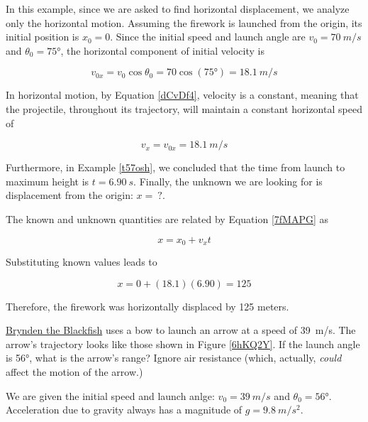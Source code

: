 \documentclass[main-physics.tex]{subfiles}
\begin{document}
\Solution In this example, since we are asked to find horizontal displacement, we analyze only the horizontal motion. Assuming the firework is launched from the origin, its initial position is $x_0 = 0$. Since the initial speed and launch angle are $v_0 = \SI{70}{m/s}$ and $\theta_0 = \ang{75}$,  the horizontal component of initial velocity is

\begin{equation*}
    v_{0x} = v_0 \cos{\theta_0} = 70 \cos{(\ang{75})} = \SI{18.1}{m/s}
\end{equation*}

In horizontal motion, by Equation \eqref{dCvDf4}, velocity is a constant, meaning that the projectile, throughout its trajectory, will maintain a constant horizontal speed of 

\begin{equation*}
    v_x = v_{0x} = \SI{18.1}{m/s}
\end{equation*}


Furthermore, in Example \ref{t57osh}, we concluded that the time from launch to maximum height is $t = \SI{6.90}{s}$. Finally, the unknown we are looking for is displacement from the origin: $x =\ ?$.

\vspace{1em}

The known and unknown quantities are related by Equation \eqref{7fMAPG} as

\begin{equation*}
    x = x_0 + v_x t
\end{equation*}

Substituting known values leads to 

\begin{equation*}
    x = 0 + (18.1)(6.90) = 125 
\end{equation*}

Therefore, the firework was horizontally displaced by 125 meters.

\endsolution

\begin{example}
    \href{https://youtu.be/9Ijev8RHF04}{Brynden the Blackfish} uses a bow to launch an arrow at a speed of \SI{39}{m/s}. The arrow's trajectory looks like those shown in Figure \ref{6hKQ2Y}. If the launch angle is \ang{56}, what is the arrow's range? Ignore air resistance (which, actually, \textit{could} affect the motion of the arrow.) 
\end{example}

\Solution We are given the initial speed and launch anlge: $v_0 = \SI{39}{m/s}$ and $\theta_0 = \ang{56}$. Acceleration due to gravity always has a magnitude of $g = \SI{9.8}{m/s^2}$. 
\end{document}
